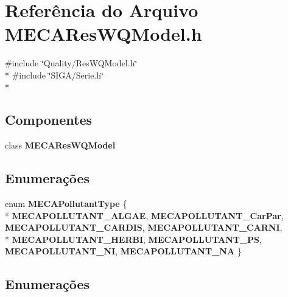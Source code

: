 \section{Referência do Arquivo M\+E\+C\+A\+Res\+W\+Q\+Model.\+h}
\label{_m_e_c_a_res_w_q_model_8h}
{\ttfamily \#include \char`\"{}Quality/\+Res\+W\+Q\+Model.\+h\char`\"{}}\\*
{\ttfamily \#include \char`\"{}S\+I\+G\+A/\+Serie.\+h\char`\"{}}\\*
\subsection*{Componentes}
\begin{DoxyCompactItemize}
\item 
class {\bf M\+E\+C\+A\+Res\+W\+Q\+Model}
\end{DoxyCompactItemize}
\subsection*{Enumerações}
\begin{DoxyCompactItemize}
\item 
enum {\bf M\+E\+C\+A\+Pollutant\+Type} \{ \\*
{\bf M\+E\+C\+A\+P\+O\+L\+L\+U\+T\+A\+N\+T\+\_\+\+A\+L\+G\+AE}, 
{\bf M\+E\+C\+A\+P\+O\+L\+L\+U\+T\+A\+N\+T\+\_\+\+Car\+Par}, 
{\bf M\+E\+C\+A\+P\+O\+L\+L\+U\+T\+A\+N\+T\+\_\+\+C\+A\+R\+D\+IS}, 
{\bf M\+E\+C\+A\+P\+O\+L\+L\+U\+T\+A\+N\+T\+\_\+\+C\+A\+R\+NI}, 
\\*
{\bf M\+E\+C\+A\+P\+O\+L\+L\+U\+T\+A\+N\+T\+\_\+\+H\+E\+R\+BI}, 
{\bf M\+E\+C\+A\+P\+O\+L\+L\+U\+T\+A\+N\+T\+\_\+\+PS}, 
{\bf M\+E\+C\+A\+P\+O\+L\+L\+U\+T\+A\+N\+T\+\_\+\+NI}, 
{\bf M\+E\+C\+A\+P\+O\+L\+L\+U\+T\+A\+N\+T\+\_\+\+NA}
 \}
\end{DoxyCompactItemize}


\subsection{Enumerações}
